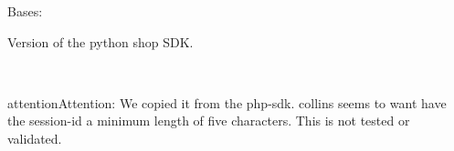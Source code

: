 \documentclass[letterpaper,10pt,english]{sphinxmanual}
\begin{document}
\begin{fulllineitems}

\begin{fulllineitems}
\label{collins:collins.Constants.TYPES}
\end{fulllineitems}


\begin{fulllineitems}
\label{collins:collins.Constants.TYPE_CATEGORIES}
\end{fulllineitems}


\begin{fulllineitems}
\label{collins:collins.Constants.TYPE_PRODUCTS}
\end{fulllineitems}


\end{fulllineitems}


\begin{fulllineitems}
\label{collins:collins.EasyCollins}
Bases: 

\end{fulllineitems}


\begin{fulllineitems}
\label{collins:collins.VERSION}
Version of the python shop SDK.

\end{fulllineitems}


\begin{fulllineitems}
\label{collins:collins.check_sessionid}~
\begin{notice}{attention}{Attention:}
We copied it from the php-sdk.
collins seems to want have the session-id a minimum length of five
characters. This is not tested or validated.
\end{notice}

\end{fulllineitems}
\end{document}
